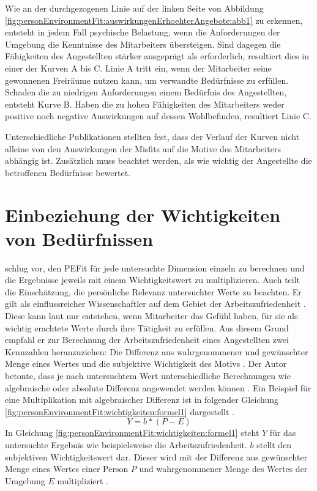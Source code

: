 Wie an der durchgezogenen Linie auf der linken Seite von Abbildung \ref{fig:personEnvironmentFit:auswirkungenErhoehterAngebote:abb1} zu erkennen, entsteht in jedem Fall psychische Belastung, wenn die Anforderungen der Umgebung die Kenntnisse des Mitarbeiters übersteigen. Sind dagegen die Fähigkeiten des Angestellten stärker ausgeprägt als erforderlich, resultiert dies in einer der Kurven A bis C. Linie A tritt ein, wenn der Mitarbeiter seine gewonnenen Freiräume nutzen kann, um verwandte Bedürfnisse zu erfüllen. Schaden die zu niedrigen Anforderungen einem Bedürfnis des Angestellten, entsteht Kurve B. Haben die zu hohen Fähigkeiten des Mitarbeiters weder positive noch negative Auswirkungen auf dessen Wohlbefinden, resultiert Linie C. \cite[S. 22f.]{edwards:2008}\cite[S. 12f.]{harrison:1978}

Unterschiedliche Publikationen stellten fest, dass der Verlauf der Kurven nicht alleine von den Auswirkungen der Misfits auf die Motive des Mitarbeiters abhängig ist. Zusätzlich muss beachtet werden, als wie wichtig der Angestellte die betroffenen Bedürfnisse bewertet. \cite[S. 9f.]{edwards:1996}

\section{Einbeziehung der Wichtigkeiten von Bedürfnissen}
\label{ch:personEnvironmentFit:wichtigkeiten}
\textcite[S. 16]{harrison:1985} schlug vor, den \ac{PEFit} für jede untersuchte Dimension einzeln zu berechnen und die Ergebnisse jeweils mit einem Wichtigkeitswert zu multiplizieren. Auch \textcite[S. 18]{locke:1969}\cite[S. 8f.]{locke:1976} teilt die Einschätzung, die persönliche Relevanz untersuchter Werte zu beachten. Er gilt als einflussreicher Wissenschaftler auf dem Gebiet der Arbeitszufriedenheit \cite[S. 12]{edwards:2008}. Diese kann laut \textcite[S. 8]{locke:1969} nur entstehen, wenn Mitarbeiter das Gefühl haben, für sie als wichtig erachtete Werte durch ihre Tätigkeit zu erfüllen. Aus diesem Grund empfahl er zur Berechnung der Arbeitszufriedenheit eines Angestellten zwei Kennzahlen heranzuziehen: Die Differenz aus wahrgenommener und gewünschter Menge eines Wertes und die subjektive Wichtigkeit des Motivs \cite[S. 8]{locke:1976}. Der Autor betonte, dass je nach untersuchtem Wert unterschiedliche Berechnungen wie algebraische oder absolute Differenz angewendet werden können \cite[S. 13]{edwards:2008}. Ein Beispiel für eine Multiplikation mit algebraischer Differenz ist in folgender Gleichung \ref{fig:personEnvironmentFit:wichtigkeiten:formel1} dargestellt \cite[S. 9]{edwards:1990}.
\begin{equation}
	Y = b * (P - E)
	\label{fig:personEnvironmentFit:wichtigkeiten:formel1}
\end{equation}
In Gleichung \ref{fig:personEnvironmentFit:wichtigkeiten:formel1} steht $Y$ für das untersuchte Ergebnis wie beispielsweise die Arbeitszufriedenheit. $b$ stellt den subjektiven Wichtigkeitswert dar. Dieser wird mit der Differenz aus gewünschter Menge eines Wertes einer Person $P$ und wahrgenommener Menge des Wertes der Umgebung $E$ multipliziert \cite[S. 9f.]{edwards:1990}.

